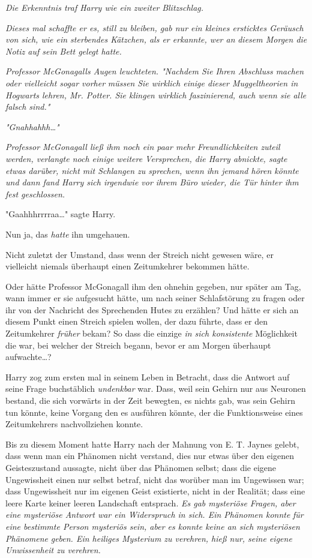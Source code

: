 {\emph{Die Erkenntnis traf Harry wie ein} \emph{\emph{zweiter}} \emph{Blitzschlag.}

\emph{Dieses mal schaffte er es, still zu bleiben, gab nur ein kleines ersticktes Geräusch von sich, wie ein sterbendes Kätzchen, als er erkannte, wer an} \emph{diesem Morgen die Notiz auf sein Bett gelegt hatte.}

\emph{Professor McGonagalls Augen leuchteten. "Nachdem Sie Ihren Abschluss machen oder vielleicht sogar vorher} \emph{\emph{müssen}} \emph{Sie wirklich einige dieser Muggeltheorien in Hogwarts lehren, Mr. Potter. Sie klingen wirklich faszinierend, auch wenn sie alle falsch sind."}

\emph{"Gnahhahhh…"}

\emph{Professor McGonagall ließ ihm noch ein paar mehr Freundlichkeiten zuteil werden, verlangte noch einige weitere Versprechen, die Harry abnickte, sagte etwas darüber, nicht mit Schlangen zu sprechen, wenn ihn jemand hören könnte und dann fand Harry sich irgendwie vor ihrem Büro wieder, die Tür hinter ihm fest geschlossen.}

"Gaahhhrrrraa…" sagte Harry.

Nun ja, das \emph{hatte} ihn umgehauen.

Nicht zuletzt der Umstand, dass wenn der Streich nicht gewesen wäre, er vielleicht niemals überhaupt einen Zeitumkehrer bekommen hätte.

Oder hätte Professor McGonagall ihm den ohnehin gegeben, nur später am Tag, wann immer er sie aufgesucht hätte, um nach seiner Schlafstörung zu fragen oder ihr von der Nachricht des Sprechenden Hutes zu erzählen? Und hätte er sich an diesem Punkt einen Streich spielen wollen, der dazu führte, dass er den Zeitumkehrer \emph{früher} bekam? So dass die einzige \emph{in sich konsistente} Möglichkeit die war, bei welcher der Streich begann, bevor er am Morgen überhaupt aufwachte…?

Harry zog zum ersten mal in seinem Leben in Betracht, dass die Antwort auf seine Frage buchstäblich \emph{undenkbar} war. Dass, weil sein Gehirn nur aus Neuronen bestand, die sich vorwärts in der Zeit bewegten, es nichts gab, was sein Gehirn tun könnte, keine Vorgang den es ausführen könnte, der die Funktionsweise eines Zeitumkehrers nachvollziehen konnte.

Bis zu diesem Moment hatte Harry nach der Mahnung von E. T. Jaynes gelebt, dass wenn man ein Phänomen nicht verstand, dies nur etwas über den eigenen Geisteszustand aussagte, nicht über das Phänomen selbst; dass die eigene Ungewissheit einen nur selbst betraf, nicht das worüber man im Ungewissen war; dass Ungewissheit nur im eigenen Geist existierte, nicht in der Realität; dass eine leere Karte keiner leeren Landschaft entsprach. \emph{Es gab mysteriöse Fragen, aber eine mysteriöse Antwort war ein Widerspruch in sich. Ein Phänomen konnte} \emph{\emph{für}} \emph{eine bestimmte Person mysteriös sein, aber es konnte keine an sich mysteriösen Phänomene} \emph{geben. Ein heiliges Mysterium zu verehren, hieß nur, seine eigene Unwissenheit zu verehren.}

}
